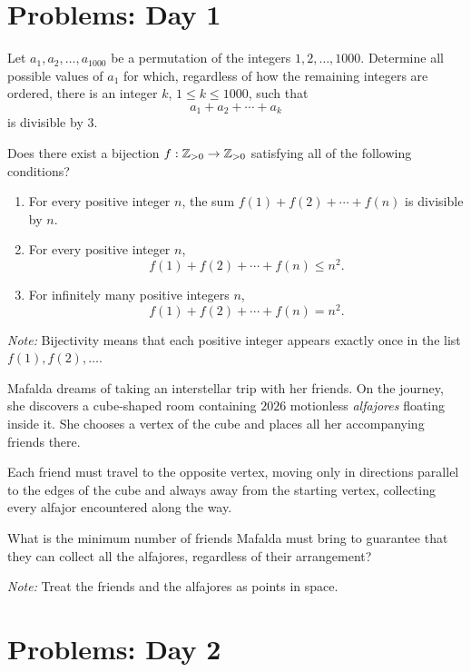 \documentclass[12pt]{memoir}
\begin{document}
\newpage
\section*{Problems: Day 1}

\begin{Ej}
Let \(a_1,a_2,\ldots,a_{1000}\) be a permutation of the integers
\(1,2,\ldots,1000\). Determine all possible values of \(a_1\) for which,
regardless of how the remaining integers are ordered, there is an integer
\(k\), \(1\leq k\leq1000\), such that
\[
    a_1+a_2+\cdots+a_k
\]
is divisible by \(3\).
\end{Ej}

\begin{Ej}
Does there exist a bijection \(f:\mathbb{Z}_{>0}\to\mathbb{Z}_{>0}\) satisfying all of
the following conditions?
\begin{enumerate}[label=(\roman*)]
    \item For every positive integer \(n\), the sum
    \(f(1)+f(2)+\cdots+f(n)\) is divisible by \(n\).
    \item For every positive integer \(n\),
    \[
        f(1)+f(2)+\cdots+f(n)\leq n^2.
    \]
    \item For infinitely many positive integers \(n\),
    \[
        f(1)+f(2)+\cdots+f(n)=n^2.
    \]
\end{enumerate}
\emph{Note:} Bijectivity means that each positive integer appears exactly
once in the list \(f(1),f(2),\ldots\).
\end{Ej}

\begin{Ej}
Mafalda dreams of taking an interstellar trip with her friends. On the
journey, she discovers a cube-shaped room containing \(2026\) motionless
\emph{alfajores} floating inside it. She chooses a vertex of
the cube and places all her accompanying friends there.

Each friend must travel to the opposite vertex, moving only in directions
parallel to the edges of the cube and always away from the starting
vertex, collecting every alfajor encountered along the way.

What is the minimum number of friends Mafalda must bring to guarantee
that they can collect all the alfajores, regardless of their arrangement?

\emph{Note:} Treat the friends and the alfajores as points in space.
\end{Ej}

\newpage
\section*{Problems: Day 2}
\end{document}
